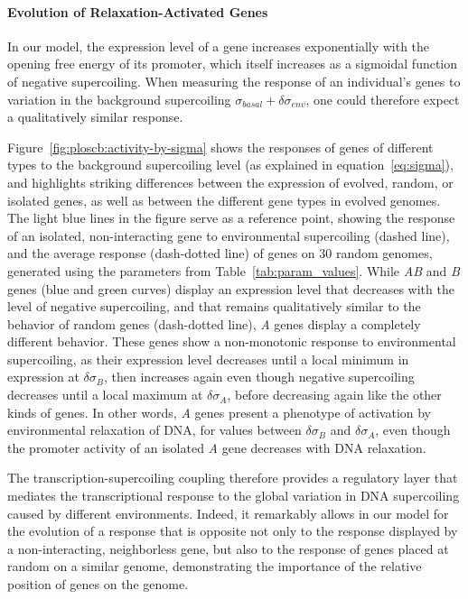 \paragraph{Evolution of Relaxation-Activated Genes}
In our model, the expression level of a gene increases exponentially with the opening free energy of its promoter, which itself increases as a sigmoidal function of negative supercoiling.
When measuring the response of an individual's genes to variation in the background supercoiling $\sigma_{basal} + \delta\sigma_{env}$, one could therefore expect a qualitatively similar response.

Figure~\ref{fig:ploscb:activity-by-sigma} shows the responses of genes of different types to the background supercoiling level (as explained in equation~\ref{eq:sigma}), and highlights striking differences between the expression of evolved, random, or isolated genes, as well as between the different gene types in evolved genomes.
The light blue lines in the figure serve as a reference point, showing the response of an isolated, non-interacting gene to environmental supercoiling (dashed line), and the average response (dash-dotted line) of genes on 30 random genomes, generated using the parameters from Table~\ref{tab:param_values}.
While \emph{AB} and \emph{B} genes (blue and green curves) display an expression level that decreases with the level of negative supercoiling, and that remains qualitatively similar to the behavior of random genes (dash-dotted line), \emph{A} genes display a completely different behavior.
These genes show a non-monotonic response to environmental supercoiling, as their expression level decreases until a local minimum in expression at $\delta\sigma_B$, then increases again even though negative supercoiling decreases until a local maximum at $\delta\sigma_A$, before decreasing again like the other kinds of genes.
In other words, \emph{A} genes present a phenotype of activation by environmental relaxation of DNA, for values between $\delta\sigma_B$ and $\delta\sigma_A$, even though the promoter activity of an isolated \emph{A} gene decreases with DNA relaxation.

The transcription-supercoiling coupling therefore provides a regulatory layer that mediates the transcriptional response to the global variation in DNA supercoiling caused by different environments.
Indeed, it remarkably allows in our model for the evolution of a response that is opposite not only to the response displayed by a non-interacting, neighborless gene, but also to the response of genes placed at random on a similar genome, demonstrating the importance of the relative position of genes on the genome.


